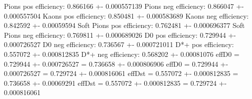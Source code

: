 Pions pos efficiency: 0.866166 +- 0.000557139
Pions neg efficiency: 0.866047 +- 0.000557504
Kaons pos efficiency: 0.850481 +- 0.000583689
Kaons neg efficiency: 0.842592 +- 0.00059594
Soft Pions pos efficiency: 0.762481 +- 0.000696377
Soft Pions neg efficiency: 0.769811 +- 0.000689026
D0 pos efficiency: 0.729944 +- 0.000726527
D0 neg efficiency: 0.736567 +- 0.000721011
D*+ pos efficiency: 0.557072 +- 0.000812835
D*+ neg efficiency: 0.568202 +- 0.00081076
effD0 = 0.729944 +- 0.000726527 = 0.736658 +- 0.000806906
effD0 = 0.729944 +- 0.000726527 = 0.729724 +- 0.000816061
effDst = 0.557072 +- 0.000812835 = 0.736658 +- 0.00069291
effDst = 0.557072 +- 0.000812835 = 0.729724 +- 0.000816061